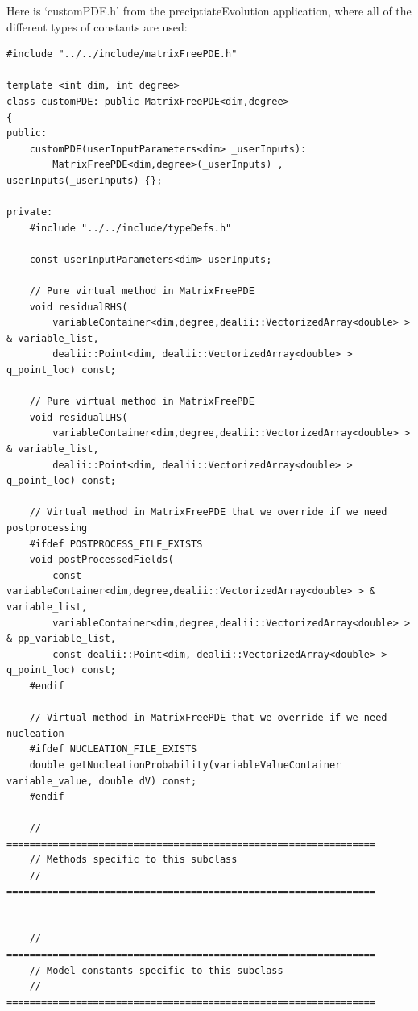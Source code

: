 \documentclass[10pt]{article} %
\begin{document}
Here is `customPDE.h' from the preciptiateEvolution application, where all of the different types of constants are used:
\scriptsize
\begin{lstlisting}
#include "../../include/matrixFreePDE.h"

template <int dim, int degree>
class customPDE: public MatrixFreePDE<dim,degree>
{
public:
	customPDE(userInputParameters<dim> _userInputs): 
		MatrixFreePDE<dim,degree>(_userInputs) , userInputs(_userInputs) {};

private:
	#include "../../include/typeDefs.h"

	const userInputParameters<dim> userInputs;

	// Pure virtual method in MatrixFreePDE
	void residualRHS(
		variableContainer<dim,degree,dealii::VectorizedArray<double> > & variable_list,
		dealii::Point<dim, dealii::VectorizedArray<double> > q_point_loc) const;

	// Pure virtual method in MatrixFreePDE
	void residualLHS(
		variableContainer<dim,degree,dealii::VectorizedArray<double> > & variable_list,
		dealii::Point<dim, dealii::VectorizedArray<double> > q_point_loc) const;

	// Virtual method in MatrixFreePDE that we override if we need postprocessing
	#ifdef POSTPROCESS_FILE_EXISTS
	void postProcessedFields(
		const variableContainer<dim,degree,dealii::VectorizedArray<double> > & variable_list,
		variableContainer<dim,degree,dealii::VectorizedArray<double> > & pp_variable_list,
		const dealii::Point<dim, dealii::VectorizedArray<double> > q_point_loc) const;
	#endif

	// Virtual method in MatrixFreePDE that we override if we need nucleation
	#ifdef NUCLEATION_FILE_EXISTS
	double getNucleationProbability(variableValueContainer variable_value, double dV) const;
	#endif

	// ================================================================
	// Methods specific to this subclass
	// ================================================================


	// ================================================================
	// Model constants specific to this subclass
	// ================================================================


\end{lstlisting}
\end{document}
